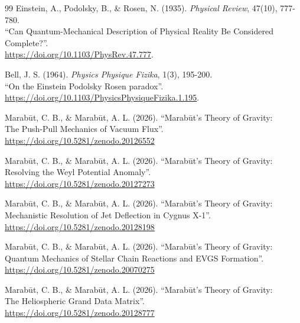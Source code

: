 \documentclass[11pt, a4paper]{article}
\begin{document}
\clearpage
\begin{thebibliography}{99}
   Einstein, A., Podolsky, B., \& Rosen, N. (1935). \textit{Physical Review}, 47(10), 777-780. \\
  ``Can Quantum-Mechanical Description of Physical Reality Be Considered Complete?''. \\
  \url{https://doi.org/10.1103/PhysRev.47.777}.

   Bell, J. S. (1964). \textit{Physics Physique Fizika}, 1(3), 195-200. \\
  ``On the Einstein Podolsky Rosen paradox''. \\
  \url{https://doi.org/10.1103/PhysicsPhysiqueFizika.1.195}.

  Marab\={u}t, C. B., \& Marab\={u}t, A. L. (2026). ``Marab\={u}t's Theory of Gravity: \\
  The Push-Pull Mechanics of Vacuum Flux''. \\
  \url{https://doi.org/10.5281/zenodo.20126552}

  Marab\={u}t, C. B., \& Marab\={u}t, A. L. (2026). ``Marab\={u}t's Theory of Gravity: \\
  Resolving the Weyl Potential Anomaly''. \\
  \url{https://doi.org/10.5281/zenodo.20127273}

  Marab\={u}t, C. B., \& Marab\={u}t, A. L. (2026). ``Marab\={u}t's Theory of Gravity: \\
  Mechanistic Resolution of Jet Deflection in Cygnus X-1''. \\
  \url{https://doi.org/10.5281/zenodo.20128198}

  Marab\={u}t, C. B., \& Marab\={u}t, A. L. (2026). ``Marab\={u}t's Theory of Gravity: \\
  Quantum Mechanics of Stellar Chain Reactions and EVGS Formation''. \\
  \url{https://doi.org/10.5281/zenodo.20070275}

  Marab\={u}t, C. B., \& Marab\={u}t, A. L. (2026). ``Marab\={u}t's Theory of Gravity: \\
  The Heliospheric Grand Data Matrix''. \\
  \url{https://doi.org/10.5281/zenodo.20128777}


\end{thebibliography}
\end{document}
